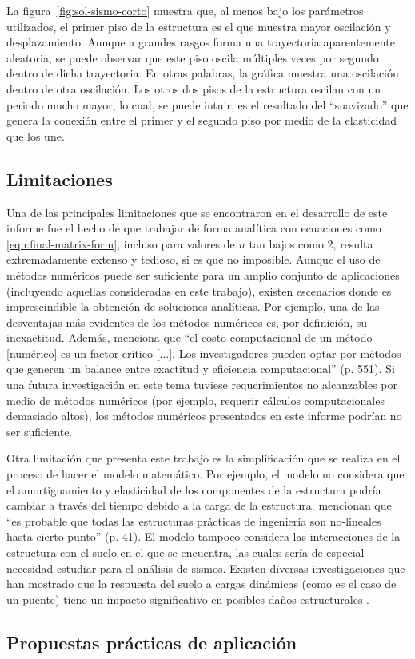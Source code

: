 La figura~\ref{fig:sol-sismo-corto} muestra que, al menos bajo los parámetros utilizados, el primer piso de la estructura es el que muestra mayor oscilación y desplazamiento. Aunque a grandes rasgos forma una trayectoria aparentemente aleatoria, se puede observar que este piso oscila múltiples veces por segundo dentro de dicha trayectoria. En otras palabras, la gráfica muestra una oscilación dentro de otra oscilación. Los otros dos pisos de la estructura oscilan con un periodo mucho mayor, lo cual, se puede intuir, es el resultado del ``suavizado'' que genera la conexión entre el primer y el segundo piso por medio de la elasticidad que los une.


\subsection{Limitaciones}

Una de las principales limitaciones que se encontraron en el desarrollo de este informe fue el hecho de que trabajar de forma analítica con ecuaciones como \eqref{eqn:final-matrix-form}, incluso para valores de \(n\) tan bajos como 2, resulta extremadamente extenso y tedioso, si es que no imposible. Aunque el uso de métodos numéricos puede ser suficiente para un amplio conjunto de aplicaciones (incluyendo aquellas consideradas en este trabajo), existen escenarios donde es imprescindible la obtención de soluciones analíticas. Por ejemplo, una de las desventajas más evidentes de los métodos numéricos es, por definición, su inexactitud. Además, \citet{kumar} menciona que ``el costo computacional de un método [numérico] es un factor crítico [...]. Los investigadores pueden optar por métodos que generen un balance entre exactitud y eficiencia computacional'' (p. 551). Si una futura investigación en este tema tuviese requerimientos no alcanzables por medio de métodos numéricos (por ejemplo, requerir cálculos computacionales demasiado altos), los métodos numéricos presentados en este informe podrían no ser suficiente.

Otra limitación que presenta este trabajo es la simplificación que se realiza en el proceso de hacer el modelo matemático. Por ejemplo, el modelo no considera que el amortiguamiento y elasticidad de los componentes de la estructura podría cambiar a través del tiempo debido a la carga de la estructura. \citet{worden} mencionan que ``es probable que todas las estructuras prácticas de ingeniería son no-lineales hasta cierto punto'' (p. 41). El modelo tampoco considera las interacciones de la estructura con el suelo en el que se encuentra, las cuales sería de especial necesidad estudiar para el análisis de sismos. Existen diversas investigaciones que han mostrado que la respuesta del suelo a cargas dinámicas (como es el caso de un puente) tiene un impacto significativo en posibles daños estructurales \citep{bapir}.


\subsection{Propuestas prácticas de aplicación}

